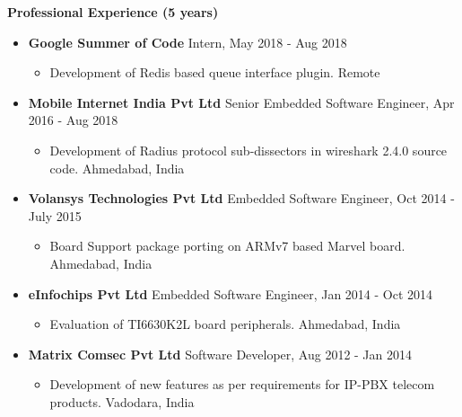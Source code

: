 \documentclass[letterpaper,11pt]{article}
\newcommand{\resitem}[1]{\item #1 \vspace{-2pt}}
\newcommand{\resheading}[1]{{\large \colorbox{mygrey}{\begin{minipage}{\textwidth}{\textbf{#1 \vphantom{p\^{E}}}}\end{minipage}}}}
\begin{document}
\resheading{Professional Experience (5 years)}
\begin{itemize}

\item
	\textbf{Google Summer of Code} \hfill{Intern, May 2018 - Aug 2018}\\
	\begin{itemize} \vspace{-2mm}
		\resitem{Development of Redis based queue interface plugin.}  \hfill{Remote}
	\end{itemize}

\item
	\textbf{Mobile Internet India Pvt Ltd} \hfill{Senior Embedded Software Engineer, Apr 2016 - Aug 2018}\\
	\begin{itemize} \vspace{-2mm}
		\resitem{Development of Radius protocol sub-dissectors in wireshark 2.4.0 source code.} \hfill{Ahmedabad, India}
	\end{itemize}

\item
	\textbf{Volansys Technologies Pvt Ltd} \hfill{Embedded Software Engineer, Oct 2014 - July 2015}\\
	\begin{itemize} \vspace{-2mm}
		\resitem{Board Support package porting on ARMv7 based Marvel board.} \hfill{Ahmedabad, India}
	\end{itemize}

\item
	\textbf{eInfochips Pvt Ltd} \hfill{Embedded Software Engineer, Jan 2014 - Oct 2014}\\
	\begin{itemize} \vspace{-2mm}
		\resitem{Evaluation of TI6630K2L board peripherals.} \hfill{Ahmedabad, India}
	\end{itemize}

\item
	\textbf{Matrix Comsec Pvt Ltd} \hfill{Software Developer, Aug 2012 - Jan 2014}\\
	\begin{itemize} \vspace{-2mm}
		\resitem{Development of new features as per requirements for IP-PBX telecom products.}
		\hfill{Vadodara, India}
	\end{itemize}

\end{itemize}
\end{document}
